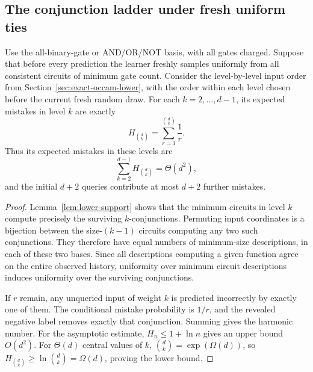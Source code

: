 \subsection{The conjunction ladder under fresh uniform ties}
\begin{proposition}
\label{prop:uniform-ties-ladder}
Use the all-binary-gate or AND/OR/NOT basis, with all gates charged.
Suppose that before every prediction the learner freshly samples
uniformly from all consistent circuits of minimum gate count.
Consider the level-by-level input order from
Section~\ref{sec:exact-occam-lower}, with the order
within each level chosen before the current fresh random draw.
For each $k=2,\ldots,d-1$, its expected mistakes in level $k$ are
exactly
\[
  H_{\binom dk}=\sum_{r=1}^{\binom dk}\frac1r.
\]
Thus its expected mistakes in these levels are
\[
  \sum_{k=2}^{d-1}H_{\binom dk}=\Theta(d^2),
\]
and the initial $d+2$ queries contribute at most $d+2$ further
mistakes.
\end{proposition}
\begin{proof}
Lemma~\ref{lem:lower-support} shows that the minimum circuits
in level $k$ compute precisely the surviving $k$-conjunctions.
Permuting input coordinates is a bijection between the size-$(k-1)$
circuits computing any two such conjunctions. They therefore have
equal numbers of minimum-size descriptions, in each of these two
bases. Since all descriptions computing a given function agree
on the entire observed history, uniformity over minimum circuit
descriptions induces uniformity over the surviving conjunctions.

If $r$ remain, any unqueried input of weight $k$ is predicted
incorrectly by exactly one of them. The conditional mistake
probability is $1/r$, and the revealed negative label removes
exactly that conjunction. Summing gives the harmonic number.
For the asymptotic estimate, $H_n\le1+\ln n$ gives an upper bound
$O(d^2)$. For $\Theta(d)$ central values of $k$,
$\binom dk=\exp(\Omega(d))$, so
$H_{\binom dk}\ge\ln\binom dk=\Omega(d)$, proving the lower bound.
\end{proof}

